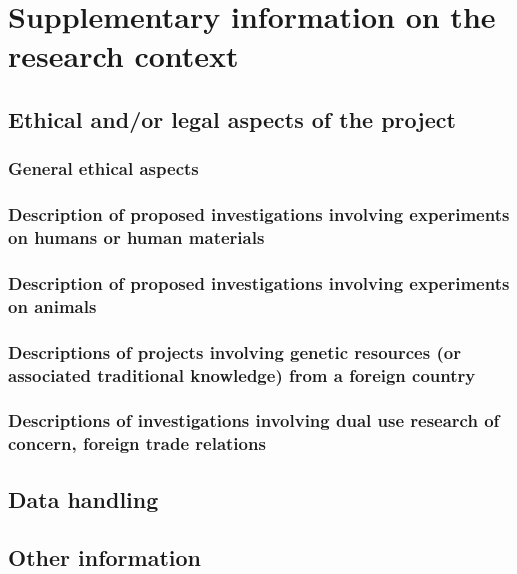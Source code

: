\section{Supplementary information on the research context}

\subsection{Ethical and/or legal aspects of the project}

\subsubsection{General ethical aspects}
\subsubsection{Description of proposed investigations involving experiments on humans or human materials}
\subsubsection{Description of proposed investigations involving experiments on animals}
\subsubsection{Descriptions of projects involving genetic resources (or associated traditional knowledge) from a foreign country}
\subsubsection{Descriptions of investigations involving dual use research of concern, foreign trade relations}

\subsection{Data handling}

\subsection{Other information}




